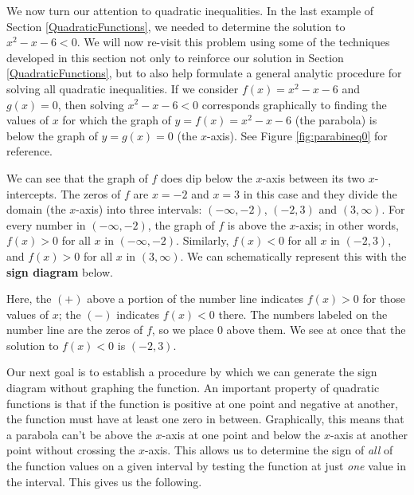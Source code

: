 We now turn our attention to quadratic inequalities. In the last example of Section \ref{QuadraticFunctions}, we needed to determine the solution to $x^2 - x -6 < 0$.  We will now re-visit this problem using some of the techniques developed in this section not only to reinforce our solution in Section \ref{QuadraticFunctions}, but to also help formulate a general analytic procedure for solving all quadratic inequalities. If we consider $f(x) = x^2-x-6$ and $g(x)=0$, then solving $x^2 - x -6 < 0$ corresponds graphically to finding the values of $x$ for which the graph of $y=f(x)=x^2-x-6$ (the parabola) is below the graph of $y=g(x)=0$ (the $x$-axis). See Figure \ref{fig:parabineq0} for reference.


\label{firstsigndiagram}

We can see that the graph of $f$ does dip below the $x$-axis between its two $x$-intercepts.  The zeros of $f$ are $x=-2$ and $x=3$ in this case and they divide the domain (the $x$-axis) into three intervals:  $(-\infty, -2)$, $(-2,3)$ and $(3, \infty)$.  For every number in $(-\infty, -2)$, the graph of $f$ is above the $x$-axis; in other words, $f(x) > 0$ for all $x$ in $(-\infty, -2)$. Similarly, $f(x) < 0$ for all $x$ in $(-2,3)$, and $f(x) > 0$ for all $x$ in $(3, \infty)$.  We can schematically represent this with the {\bf sign diagram} below.

\begin{center}
\end{center}

Here, the $(+)$ above a portion of the number line indicates $f(x) > 0$ for those values of $x$; the $(-)$ indicates $f(x) < 0$ there.  The numbers labeled on the number line are the zeros of $f$, so we place $0$ above them.  We see at once that the solution to $f(x) < 0$ is $(-2,3)$.  

\smallskip

Our next goal is to establish a procedure by which we can generate the sign diagram without graphing the function.  An important property of quadratic functions is that if the function is positive at one point and negative at another, the function must have at least one zero in between.  Graphically, this means that a parabola can't be above the $x$-axis at one point and below the $x$-axis at another point without crossing the $x$-axis.  This allows us to determine the sign of \emph{all} of the function values on a given interval by testing the function at just \emph{one} value in the interval.  This gives us the following.

